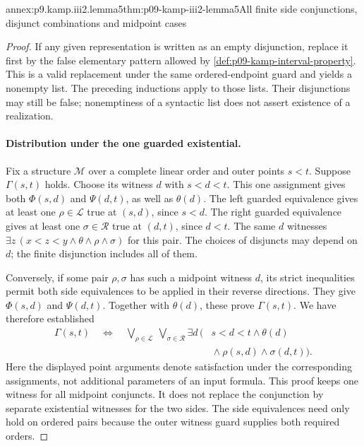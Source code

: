 \begin{annexitem}{annex:p9.kamp.iii2.lemma5}{thm:p09-kamp-iii2-lemma5}{All finite side conjunctions, disjunct combinations and midpoint cases}
\begin{proof}
If any given representation is written as an empty disjunction,
replace it first by the false elementary pattern allowed by
\cref{def:p09-kamp-interval-property}. This is a valid replacement
under the same ordered-endpoint guard and yields a nonempty list.
The preceding inductions apply to those lists. Their disjunctions
may still be false; nonemptiness of a syntactic list does not assert
existence of a realization.

\paragraph{Distribution under the one guarded existential.}
Fix a structure \(\mathcal M\) over a complete linear order and
outer points \(s<t\). Suppose \(\Gamma(s,t)\) holds. Choose its
witness \(d\) with \(s<d<t\). This one assignment gives both
\(\Phi(s,d)\) and \(\Psi(d,t)\), as well as \(\theta(d)\).
The left guarded equivalence gives at least one
\(\rho\in\mathcal L\) true at \((s,d)\), since \(s<d\).
The right guarded equivalence gives at least one
\(\sigma\in\mathcal R\) true at \((d,t)\), since \(d<t\).
The same \(d\) witnesses
\(\exists z\,(x<z<y\land\theta\land\rho\land\sigma)\) for this pair.
The choices of disjuncts may depend on \(d\); the finite disjunction
includes all of them.

Conversely, if some pair \(\rho,\sigma\) has such a midpoint
witness \(d\), its strict inequalities permit both side equivalences
to be applied in their reverse directions. They give
\(\Phi(s,d)\) and \(\Psi(d,t)\). Together with \(\theta(d)\),
these prove \(\Gamma(s,t)\). We have therefore established
\[
\begin{split}
 \Gamma(s,t)\quad\Longleftrightarrow\quad
 \bigvee_{\rho\in\mathcal L}\ \bigvee_{\sigma\in\mathcal R}
   \exists d\,\bigl(&s<d<t\land\theta(d)\\
                 &{}\land\rho(s,d)\land\sigma(d,t)\bigr).
\end{split}
\]
Here the displayed point arguments denote satisfaction under the
corresponding assignments, not additional parameters of an input formula.
This proof keeps one witness for all midpoint conjuncts. It does not
replace the conjunction by separate existential witnesses for the two
sides. The side equivalences need only hold on ordered pairs because
the outer witness guard supplies both required orders.


\end{proof}
\end{annexitem}
